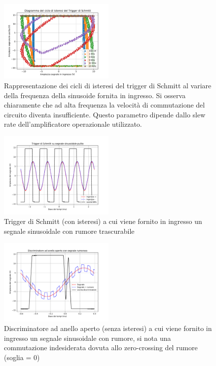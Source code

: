 \documentclass[journal]{IEEEtran}
\begin{document}
\begin{figure}[H]%
\begin {center}
\includegraphics[width=0.50\textwidth]{analysis/output/OPA-trigger-histeresis-overlapped.pdf}
\caption{Rappresentazione dei cicli di isteresi del trigger di Schmitt al variare della frequenza della sinusoide fornita in ingresso. Si osserva chiaramente che ad alta frequenza la velocità di commutazione del circuito diventa insufficiente. Questo parametro dipende dallo slew rate dell'amplificatore operazionale utilizzato.}
\label{fig:trigger-hyst}
\end {center}
\end{figure}

\begin{figure}[H]%
\begin {center}
\includegraphics[width=0.50\textwidth]{analysis/output/trigger1.pdf}
\caption{Trigger di Schmitt (con isteresi) a cui viene fornito in ingresso un segnale sinusoidale con rumore trascurabile}
\label{fig:trigger-clean}
\end {center}
\end{figure}

\begin{figure}[H]%
\begin {center}
\includegraphics[width=0.50\textwidth]{analysis/output/noisy-open-ring.pdf}
\caption{Discriminatore ad anello aperto (senza isteresi) a cui viene fornito in ingresso un segnale sinusoidale con rumore, si nota una commutazione indesiderata dovuta allo zero-crossing del rumore (soglia = 0)}
\label{fig:trigger-noisy}
\end {center}
\end{figure}
\end{document}
